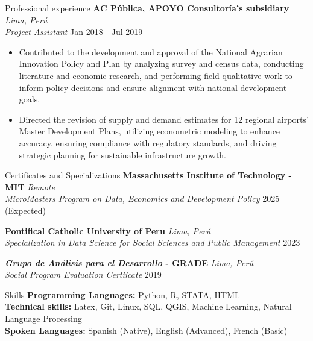 \documentclass{resume} %
\begin{document}
\begin{rSection}{Professional experience}
\textbf{AC Pública, APOYO Consultoría's subsidiary} \hfill \textit{Lima, Perú}\\
\textit{Project Assistant} \hfill Jan 2018 - Jul 2019
 \begin{itemize}
    \itemsep -3pt {} 
     \item Contributed to the development and approval of the National Agrarian Innovation Policy and Plan by analyzing survey and census data, conducting literature and economic research, and performing field qualitative work to inform policy decisions and ensure alignment with national development goals.
     \item Directed the revision of supply and demand estimates for 12 regional airports’ Master Development Plans, utilizing econometric modeling to enhance accuracy, ensuring compliance with regulatory standards, and driving strategic planning for sustainable infrastructure growth.
 \end{itemize}
\end{rSection} 

\pagebreak
\begin{rSection}{Certificates and Specializations}
    {\bf Massachusetts  Institute  of  Technology  -  MIT} \hfill \textit{Remote} \\
    \textit{MicroMasters Program on Data, Economics and Development Policy} \hfill {2025 (Expected)}

    {\bf Pontifical Catholic University of Peru} \hfill \textit{Lima, Perú} \\
    \textit{Specialization in Data Science for Social Sciences and Public Management} \hfill {2023}


    {\bf \textit{Grupo de Análisis para el Desarrollo} - GRADE} \hfill \textit{Lima, Perú} \\
    \textit{Social Program Evaluation Certiicate} \hfill {2019}
\end{rSection}

\begin{rSection}{Skills} 
    \textbf{Programming Languages:} Python, R, STATA, HTML\\
    \textbf{Technical skills:} Latex, Git, Linux, SQL, QGIS, Machine Learning, Natural Language Processing \\
    \textbf{Spoken Languages:} Spanish (Native), English (Advanced), French (Basic)
\end{rSection}
\end{document}
